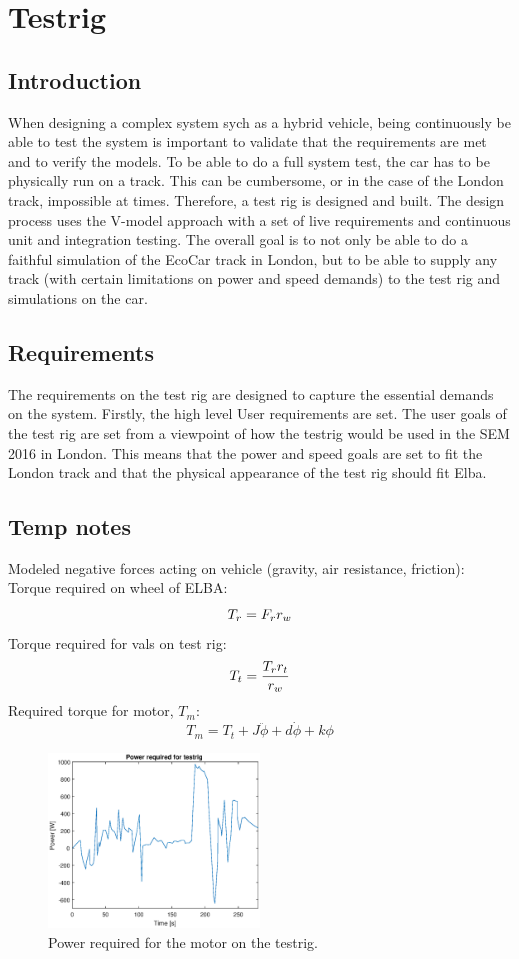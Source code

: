 \chapter{Testrig}
\section{Introduction}
When designing a complex system sych as a hybrid vehicle, being continuously be
able to test the system is important to validate that the requirements are met
and to verify the models. To be able to do a full system test, the car has to be
physically run on a track. This can be cumbersome, or in the case of the London
track, impossible at times. Therefore, a test rig is designed and built. The
design process uses the V-model approach with a set of live requirements and
continuous unit and integration testing. The overall goal is to not only be able
to do a faithful simulation of the EcoCar track in London, but to be able to
supply any track (with certain limitations on power and speed demands) to the
test rig and simulations on the car.

\section{Requirements}
The requirements on the test rig are designed to capture the essential demands
on the system. Firstly, the high level User requirements are set. The user goals
of the test rig are set from a viewpoint of how the testrig would be used in the
SEM 2016 in London. This means that the power and speed goals are set to fit the
London track and that the physical appearance of the test rig should fit Elba.

\section{Temp notes}
Modeled negative forces acting on vehicle (gravity, air resistance, friction): 
Torque required on wheel of ELBA:$$T_r = F_r\*r_w$$
Torque required for vals on test rig: $$T_t = \frac{T_r\*r_t}{r_w}$$
Required torque for motor, $T_m$:
$$T_m = T_t + J\ddot{\phi} + d\dot{\phi} + k\phi$$


\begin{figure}[H]
    \centering
    \label{fig:testrig_power_required_motor}
    \includegraphics[width=0.5\textwidth]{./testrig/power_required_testrig.eps}
    \caption{Power required for the motor on the testrig.}
\end{figure}
